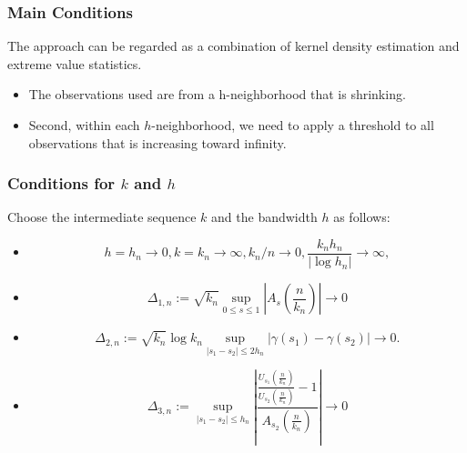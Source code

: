 \documentclass{beamer}
\begin{document}
\begin{frame}
    \frametitle{Main Conditions}
The approach can be regarded as a combination of kernel density estimation and extreme value statistics.
\bigskip
\begin{itemize}
    \item The observations used are from a h-neighborhood that is shrinking.
    \bigskip
    \item Second, within each $h$-neighborhood, we need to apply a threshold to all observations that is increasing toward infinity. 
\end{itemize}
    

\end{frame}

\begin{frame}
    \frametitle{Conditions for $k$ and $h$}
Choose the intermediate sequence $k$ and the bandwidth $h$ as follows:
\begin{itemize}
    \item \begin{equation}\tag{4}
        h=h_n\to 0, k=k_n \to \infty, k_n/n \to 0, \dfrac{k_nh_n}{|\log h_n|}\to \infty,   
    \end{equation}
 


\item \begin{equation}\tag{5}
    \Delta_{1,n}:=\sqrt{k_n}\sup_{0\le s\le 1}|A_s(\dfrac{n}{k_n})|\to 0 
\end{equation}

  

\item \begin{equation}\tag{6}
    \Delta_{2, n}:=\sqrt{k_{n}} \log k_{n} \sup _{\left|s_{1}-s_{2}\right| \leq 2 h_{n}}\left|\gamma\left(s_{1}\right)-\gamma\left(s_{2}\right)\right| \rightarrow 0.  
\end{equation}



\item \begin{equation}\tag{7}
    \Delta_{3, n}:=\sup _{\left|s_{1}-s_{2}\right| \leq h_{n}}\left|\frac{\frac{U_{s_{1}}\left(\frac{n}{k_{n}}\right)}{U_{s_{2}}\left(\frac{n}{k_{n}}\right)}-1}{A_{s_{2}}\left(\frac{n}{k_{n}}\right)}\right| \rightarrow 0 
\end{equation}
\end{itemize}
    

\end{frame}
\end{document}
